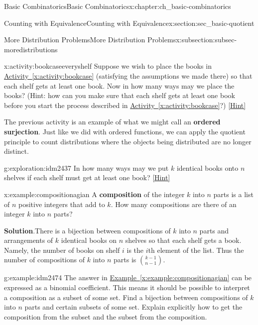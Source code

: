 \documentclass[oneside,10pt,]{book}
\newcommand{\terminology}[1]{\textbf{#1}}
\numberwithin{equation}{chapter}
\begin{document}
\begin{chapterptx}{Basic Combinatorics}{}{Basic Combinatorics}{}{}{x:chapter:ch_basic-combinatorics}
\begin{sectionptx}{Counting with Equivalence}{}{Counting with Equivalence}{}{}{x:section:sec_basic-quotient}
\begin{subsectionptx}{More Distribution Problems}{}{More Distribution Problems}{}{}{x:subsection:subsec-moredistributions}
\begin{activity}{}{x:activity:bookcaseeveryshelf}%
Suppose we wish to place the books in \hyperref[x:activity:bookcase]{Activity~\ref{x:activity:bookcase}} (satisfying the assumptions we made there) so that each shelf gets at least one book. Now in how many ways may we place the books? (Hint: how can you make sure that each shelf gets at least one book before you start the process described in \hyperref[x:activity:bookcase]{Activity~\ref{x:activity:bookcase}}?)%
\space\hspace*{0pt}\hfill{\tiny\hyperlink{g:hint:idm2417-back}{[Hint]}}\end{activity}
The previous activity is an example of what we might call an \terminology{ordered surjection}.  Just like we did with ordered functions, we can apply the quotient principle to count distributions where the objects being distributed are no longer distinct.%
\begin{exploration}{}{g:exploration:idm2437}%
In how many ways may we put \(k\) identical books onto \(n\) shelves if each shelf must get at least one book?%
\space\hspace*{0pt}\hfill{\tiny\hyperlink{g:hint:idm2442-back}{[Hint]}}\end{exploration}
\begin{example}{}{x:example:compositionagian}%
A \terminology{composition} of the integer \(k\) into \(n\) parts is a list of \(n\) positive integers that add to \(k\).  How many compositions are there of an integer \(k\) into \(n\) parts?%
\par\smallskip%
\noindent\textbf{Solution}.\hypertarget{g:solution:idm2463}{}\quad{}There is a bijection between compositions of \(k\) into \(n\) parts and arrangements of \(k\) identical books on \(n\) shelves so that each shelf gets a book. Namely, the number of books on shelf \(i\) is the \(i\)th element of the list. Thus the number of compositions of \(k\) into \(n\) parts is \(\binom{k-1}{n-1}\).%
\end{example}
\begin{example}{}{g:example:idm2474}%
The answer in \hyperref[x:example:compositionagian]{Example~\ref{x:example:compositionagian}} can be expressed as a binomial coefficient. This means it should be possible to interpret a composition as a subset of some set. Find a bijection between compositions of \(k\) into \(n\) parts and certain subsets of some set.  Explain explicitly how to get the composition from the subset and the subset from the composition.%
\par\smallskip%

\end{example}
\end{subsectionptx}
\end{sectionptx}
\end{chapterptx}
\end{document}
